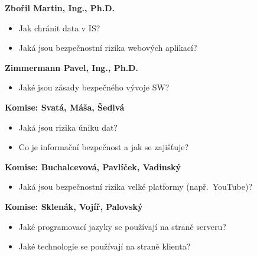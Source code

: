 \begin{profesorbox}
\begin{itemize}
\end{itemize}
\textbf{Zbořil Martin, Ing., Ph.D.}
\begin{itemize}
  \item Jak chránit data v IS?
  \item Jaká jsou bezpečnostní rizika webových aplikací?
\end{itemize}
\textbf{Zimmermann Pavel, Ing., Ph.D.}
\begin{itemize}
  \item Jaké jsou zásady bezpečného vývoje SW?
\end{itemize}
\textbf{Komise: Svatá, Máša, Šedivá}
\begin{itemize}
  \item Jaká jsou rizika úniku dat?
  \item Co je informační bezpečnost a jak se zajišťuje?
\end{itemize}
\textbf{Komise: Buchalcevová, Pavlíček, Vadinský}
\begin{itemize}
  \item Jaká jsou bezpečnostní rizika velké platformy (např.\ YouTube)?
\end{itemize}
\textbf{Komise: Sklenák, Vojíř, Palovský}
\begin{itemize}
  \item Jaké programovací jazyky se používají na straně serveru?
  \item Jaké technologie se používají na straně klienta?
\end{itemize}
\end{profesorbox}
